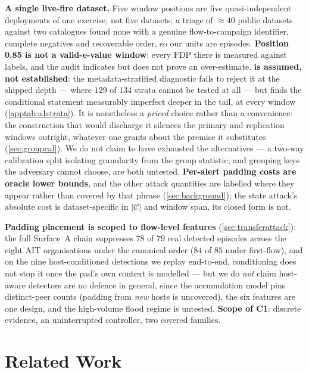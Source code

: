 \documentclass[conference]{IEEEtran}
\newcommand{\Cal}{\mathcal{C}}
\newcommand{\nCal}{\lvert\Cal\rvert}
\newcommand{\FDP}{\mathrm{FDP}}
\begin{document}
\textbf{A single live-fire dataset.} Five window positions are five quasi-independent deployments of
one exercise, not five datasets; a triage of $\approx\!40$ public datasets against two catalogues found
none with a genuine flow-to-campaign identifier, complete negatives and recoverable
order, so our units are episodes. \textbf{Position 0.85 is not a valid-e-value window}:
every $\FDP$ there is measured against labels, and the audit indicates but does not
prove an over-estimate. \textbf{ is assumed, not established}: the
metadata-stratified diagnostic fails to reject it at the shipped depth --- where $129$ of $134$
strata cannot be tested at all --- but finds the conditional statement measurably imperfect deeper in
the tail, at every window (\cref{apptab:a1strata}). It is nonetheless a \emph{priced} choice rather
than a convenience: the construction that would discharge it silences the primary and replication
windows outright, whatever one grants about the premise it substitutes (\cref{sec:groupcal}). We do not claim to have exhausted the
alternatives --- a two-way calibration split isolating granularity from the group statistic, and
grouping keys the adversary cannot choose, are both untested. \textbf{Per-alert padding costs are oracle lower bounds}, and the other attack quantities are
labelled where they appear rather than covered by that phrase (\cref{sec:background}); the state
attack's absolute cost is
dataset-specific in $\nCal$ and window span, its closed form is not.

\textbf{Padding placement is scoped to flow-level features} (\cref{sec:transferattack}): the full
Surface~A chain suppresses $78$ of $79$ real detected episodes across the eight AIT organisations under
the canonical order ($84$ of $85$ under first-flow), and
on the nine host-conditioned detections we replay end-to-end, conditioning does not stop it once the
pad's own context is modelled --- but we do \emph{not} claim host-aware detectors are no defence in
general, since the accumulation model pins distinct-peer counts (padding from \emph{new} hosts is
uncovered), the six features are one design, and the high-volume flood regime is untested.
\textbf{Scope of C1}: discrete evidence, an uninterrupted controller, two covered families.

\section{Related Work}\label{sec:related}
\end{document}
